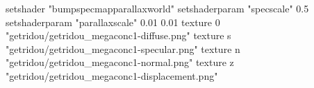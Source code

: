 setshader "bumpspecmapparallaxworld"
setshaderparam "specscale" 0.5
setshaderparam "parallaxscale" 0.01 0.01
texture 0 "getridou/getridou_megaconc1-diffuse.png"
texture s "getridou/getridou_megaconc1-specular.png"
texture n "getridou/getridou_megaconc1-normal.png"
texture z "getridou/getridou_megaconc1-displacement.png"
